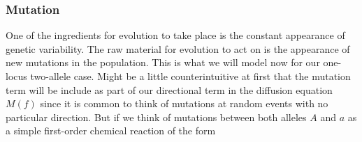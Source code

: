 \subsubsection{Mutation}

One of the ingredients for evolution to take place is the constant appearance
of genetic variability. The raw material for evolution to act on is the
appearance of new mutations in the population. This is what we will model now
for our one-locus two-allele case. Might be a little counterintuitive at first
that the mutation term will be include as part of our directional term in the
diffusion equation $M(f)$ since it is common to think of mutations at random
events with no particular direction. But if we think of mutations between both
alleles $A$ and $a$ as a simple first-order chemical reaction of the form
